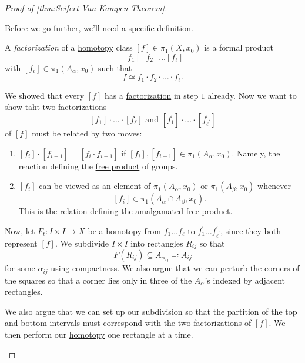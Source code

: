 \begin{proof}[Proof of \autoref{thm:Seifert-Van-Kampen-Theorem}]
\begin{enumerate}
		      Before we go further, we'll need a specific definition.
		      \begin{definition}[Factorization]\label{def:factorization}
			      A \emph{factorization} of a \hyperref[def:homotopy]{homotopy} class \([f]\in \pi _1(X, x_{0})\) is a formal product
			      \[
				      [f_1][f_2]\ldots [f_{\ell }]
			      \]
			      with \([f_{i}]\in \pi _1(A_\alpha , x_0)\) such that
			      \[
				      f\simeq f_1\cdot f_2\cdot\ldots \cdot f_{\ell}.
			      \]
		      \end{definition}
		      We showed that every \([f]\) has a \hyperref[def:factorization]{factorization} in step \(1\) already. Now we want to show taht
		      two \hyperref[def:factorization]{factorizations}
		      \[
			      [f_{1}]\cdot \ldots \cdot[f_{\ell }] \text{ and } [f_{1} ^\prime ]\cdot \ldots \cdot[f_{\ell ^\prime } ^\prime ]
		      \]
		      of \([f]\) must be related by two moves:
		      \begin{enumerate}
			      \item \([f_{i}]\cdot[f_{i+1}] = [f_{i}\cdot f_{i+1}]\) if \([f_{i}], [f_{i+1}]\in \pi _1(A_\alpha , x_0)\). Namely, the reaction
			            defining the \hyperref[def:free-product-with-amalgamation]{free product} of groups.
			      \item \([f_{i}]\) can be viewed as an element of \(\pi _1(A_\alpha , x_{0})\) or \(\pi _1(A_\beta , x_0)\) whenever
			            \[
				            [f_{i}]\in \pi _1(A_\alpha \cap A_\beta , x_{0}).
			            \]
			            This is the relation defining the \hyperref[def:free-product-with-amalgamation]{amalgamated free product}.
		      \end{enumerate}
		      Now, let \(F_{t}\colon I\times I\to X\) be a \hyperref[def:homotopy]{homotopy} from \(f_1 \ldots f_{\ell } \) to
		      \(f_1 ^\prime \ldots f ^\prime _{\ell ^\prime } \), since they both represent \([f]\). We subdivide \(I\times I\) into
		      rectangles \(R_{ij}\) so that
		      \[
			      F(R_{ij})\subseteq A_{\alpha _{ij}}\eqqcolon A_{ij}
		      \]
		      for some \(\alpha _{ij}\) using compactness. We also argue that we can perturb the corners of the squares so that a corner
		      lies only in three of the \(A_\alpha \)'s indexed by adjacent rectangles.
		      \begin{figure}[H]
			      \centering
			      \label{fig:pf:Seifert-Van-Kampen-thm-1}
		      \end{figure}
		      We also argue that we can set up our subdivision so that the partition of the top and bottom intervals must correspond with the
		      two \hyperref[def:factorization]{factorizations} of \([f]\). We then perform our \hyperref[def:homotopy]{homotopy} one
		      rectangle at a time.
		      \begin{figure}[H]
			      \centering
			      \label{fig:pf:Seifert-Van-Kampen-thm-2}
		      \end{figure}

\end{enumerate}
\end{proof}
